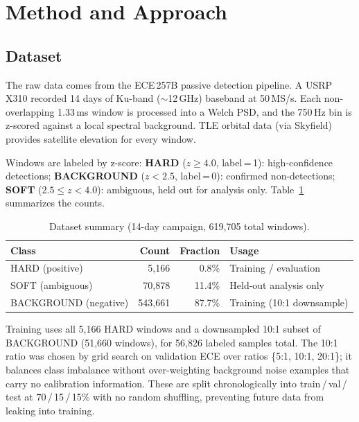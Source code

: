 \documentclass{article}
\begin{document}
\section{Method and Approach}

\subsection{Dataset}

The raw data comes from the ECE\,257B passive detection pipeline.
A USRP\,X310 recorded 14 days of Ku-band ($\sim$12\,GHz) baseband at 50\,MS/s.
Each non-overlapping 1.33\,ms window is processed into a Welch PSD, and the
750\,Hz bin is z-scored against a local spectral background.
TLE orbital data (via Skyfield) provides satellite elevation for every window.

Windows are labeled by z-score:
\textbf{HARD} ($z \geq 4.0$, label\,=\,1): high-confidence detections;
\textbf{BACKGROUND} ($z < 2.5$, label\,=\,0): confirmed non-detections;
\textbf{SOFT} ($2.5 \leq z < 4.0$): ambiguous, held out for analysis only.
Table~\ref{tab:dataset} summarizes the counts.

\begin{table}[h]
\centering
\caption{Dataset summary (14-day campaign, 619,705 total windows).}
\label{tab:dataset}
\begin{tabular}{lrrl}
\toprule
Class & Count & Fraction & Usage \\
\midrule
HARD (positive) & 5,166 & 0.8\% & Training / evaluation \\
SOFT (ambiguous) & 70,878 & 11.4\% & Held-out analysis only \\
BACKGROUND (negative) & 543,661 & 87.7\% & Training (10:1 downsample) \\
\bottomrule
\end{tabular}
\end{table}

Training uses all 5,166 HARD windows and a downsampled 10:1 subset of BACKGROUND
(51,660 windows), for 56,826 labeled samples total. The 10:1 ratio was chosen by
grid search on validation ECE over ratios \{5:1, 10:1, 20:1\}; it balances class
imbalance without over-weighting background noise examples that carry no
calibration information. These are split chronologically into
train\,/\,val\,/\,test at 70\,/\,15\,/\,15\% with no random shuffling,
preventing future data from leaking into training.
\end{document}

